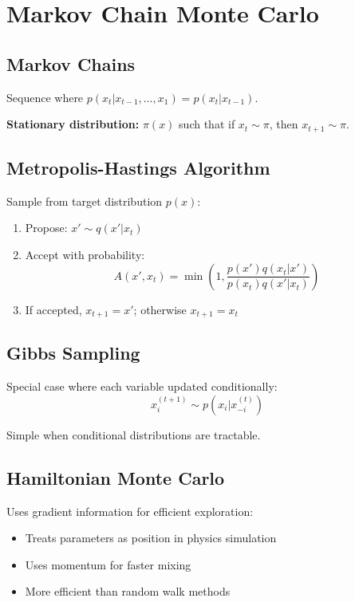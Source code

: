 
\section{Markov Chain Monte Carlo }
\label{sec:mcmc}

\subsection{Markov Chains}

Sequence where $p(x_t|x_{t-1}, \ldots, x_1) = p(x_t|x_{t-1})$.

\textbf{Stationary distribution:} $\pi(x)$ such that if $x_t \sim \pi$, then $x_{t+1} \sim \pi$.

\subsection{Metropolis-Hastings Algorithm}

Sample from target distribution $p(x)$:
\begin{enumerate}
    \item Propose: $x' \sim q(x'|x_t)$
    \item Accept with probability:
    \begin{equation}
    A(x', x_t) = \min\left(1, \frac{p(x')q(x_t|x')}{p(x_t)q(x'|x_t)}\right)
    \end{equation}
    \item If accepted, $x_{t+1} = x'$; otherwise $x_{t+1} = x_t$
\end{enumerate}

\subsection{Gibbs Sampling}

Special case where each variable updated conditionally:
\begin{equation}
x_i^{(t+1)} \sim p(x_i | x_{-i}^{(t)})
\end{equation}

Simple when conditional distributions are tractable.

\subsection{Hamiltonian Monte Carlo}

Uses gradient information for efficient exploration:
\begin{itemize}
    \item Treats parameters as position in physics simulation
    \item Uses momentum for faster mixing
    \item More efficient than random walk methods
\end{itemize}


